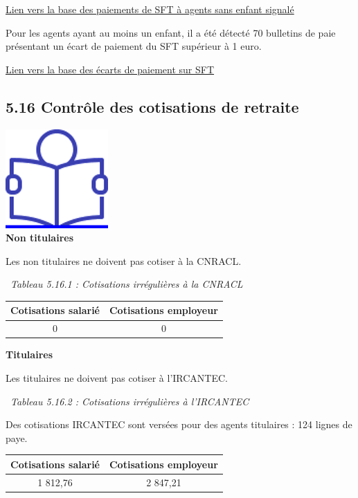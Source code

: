 \href{../Bases/Reglementation/Paie.sans.enfant.reduit.csv}{Lien vers la
base des paiements de SFT à agents sans enfant signalé}

Pour les agents ayant au moins un enfant, il a été détecté 70 bulletins
de paie présentant un écart de paiement du SFT supérieur à 1 euro.

\href{../Bases/Reglementation/controle.sft.csv}{Lien vers la base des
écarts de paiement sur SFT}

\hypertarget{controle-des-cotisations-de-retraite}{%
\subsection{5.16 Contrôle des cotisations de
retraite}\label{controle-des-cotisations-de-retraite}}

\href{../Docs/Notices/fiche_retraite.odt}{\includegraphics{icones/Notice.png}}\\
\textbf{Non titulaires}

Les non titulaires ne doivent pas cotiser à la CNRACL.

~\emph{Tableau 5.16.1 : Cotisations irrégulières à la CNRACL}

\begin{longtable}[]{@{}cc@{}}
\toprule
Cotisations salarié & Cotisations employeur\tabularnewline
\midrule
\endhead
0 & 0\tabularnewline
\bottomrule
\end{longtable}

\textbf{Titulaires}

Les titulaires ne doivent pas cotiser à l'IRCANTEC.

~\emph{Tableau 5.16.2 : Cotisations irrégulières à l'IRCANTEC}

Des cotisations IRCANTEC sont versées pour des agents titulaires : 124
lignes de paye.

\begin{longtable}[]{@{}cc@{}}
\toprule
Cotisations salarié & Cotisations employeur\tabularnewline
\midrule
\endhead
1 812,76 & 2 847,21\tabularnewline
\bottomrule
\end{longtable}


